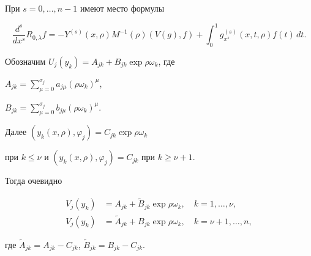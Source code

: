 \begin{cornonum}


При $s=0,\dotsc,n-1$ имеют место формулы


$$


\frac {d^s}{dx^s}R_{0,\lambda} f=-Y^{(s)}(x,\rho)M^{-1}


(\rho)(V(g),f)+\int_0^1g_{x^s}^{(s)}(x,t,\rho)f(t)\,dt.


$$


\end{cornonum}





Обозначим $U_j(y_k)=A_{jk}+B_{jk}\exp\rho\omega_k$, где


$A_{jk}=\sum\limits_{\mu=0}^{\sigma_j}a_{j\mu}(\rho\omega_k)^\mu$,


$B_{jk}=\sum\limits_{\mu=0}^{\sigma_j}b_{j\mu}(\rho\omega_k)^\mu$.


Далее $(y_k(x,\rho),\varphi_j)=C_{jk}\exp\rho\omega_k$


при $k\le\nu$ и $(y_k(x,\rho),\varphi_j)=C_{jk}$ при $k\ge\nu+1$.


Тогда очевидно


\begin{align*}


V_j(y_k)&=A_{jk}+\widetilde B_{jk}\exp\rho\omega_k,\quad k=1,\dotsc,\nu,\\


%


V_j(y_k)&=\widetilde A_{jk}+B_{jk}\exp\rho\omega_k,\quad k=\nu+1,\dotsc,n,


\end{align*}


где $\widetilde A_{jk}=A_{jk}-C_{jk}$, $\widetilde B_{jk}=B_{jk}-C_{jk}$.





